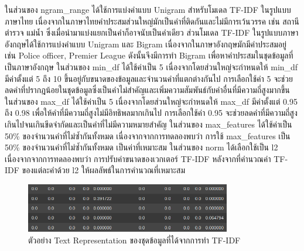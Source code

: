 \documentclass[12pt,oneside,openright,a4paper]{cpe-thai-project}
\begin{document}
      \newline\hspace*{1cm}ในส่วนของ ngram\_range ได้ใช้การแบ่งคำแบบ Unigram สำหรับโมเดล TF-IDF ในรูปแบบภาษาไทย
      เนื่องจากในภาษาไทยคำประสมส่วนใหญ่มักเป็นคำที่ติดกันและไม่มีการเว้นวรรค เช่น สถานีตำรวจ แม่น้ำ ซึ่งเมื่อนำมาแบ่งแยกเป็นคำก็อาจนับเป็นคำเดียว
      ส่วนโมเดล TF-IDF ในรูปแบบภาษาอังกฤษได้ใช้การแบ่งคำแบบ Unigram และ Bigram 
      เนื่องจากในภาษาอังกฤษมักมีคำประสมอยู่ เช่น Police officer, Premier League ดังนั้นจึงมีการทำ Bigram เพื่อหาคำประสมในชุดข้อมูลที่เป็นภาษาอังกฤษ
      \newline\hspace*{1cm}ในส่วนของ min\_df ได้ใช้ค่าเป็น 5 เนื่องจากโดยส่วนใหญ่จะกำหนดให้ min\_df มีค่าตั้งแต่ 5 ถึง 10 ขึ้นอยู่กับขนาดของข้อมูลและจำนวนคำที่แตกต่างกันไป
      การเลือกใช้ค่า 5 จะช่วยลดคำที่ปรากฎน้อยในชุดข้อมูลซึ่งเป็นคำไม่สำคัญและเพิ่มความสัมพันธ์กับคำอื่นที่มีความถี่สูงมากขึ้น
      \newline\hspace*{1cm}ในส่วนของ max\_df ได้ใช้ค่าเป็น 5 เนื่องจากโดยส่วนใหญ่จะกำหนดให้ max\_df มีค่าตั้งแต่ 0.95 ถึง 0.98 เพื่อให้คำที่มีความถี่สูงไม่มีอิทธิพลมากเกินไป
      การเลือกใช้ค่า 0.95 จะช่วยลดคำที่มีความถี่สูงเกินไปจนเกินขีดจำกัดและเป็นคำที่ไม่มีความหมายสำคัญ
      \newline\hspace*{1cm}ในส่วนของ max\_features ได้ใช้ค่าเป็น 50\% ของจำนวนคำที่ไม่ซ้ำกันทั้งหมด
      เนื่องจากจากการทดลองพบว่า การใช้ max\_features เป็น 50\% ของจำนวนคำที่ไม่ซ้ำกันทั้งหมด เป็นค่าที่เหมาะสม
      \newline\hspace*{1cm}ในส่วนของ norm ได้เลือกใช้เป็น l2 เนื่องจากจากการทดลองพบว่า 
      การปรับค่าขนาดของเวกเตอร์ TF-IDF หลังจากที่คำนวณค่า TF-IDF ของแต่ละคำด้วย l2 ให้ผลลัพธ์ในการคำนวณที่เหมาะสม
      \begin{figure}[!ht]\centering
        \includegraphics[width=0.8\textwidth]{./img/tfidf_vector.png}
        \caption{ตัวอย่าง Text Representation ของชุดข้อมูลที่ได้จากการทำ TF-IDF}\label{fig:tfidf_vec}
      \end{figure}
      
\end{document}
